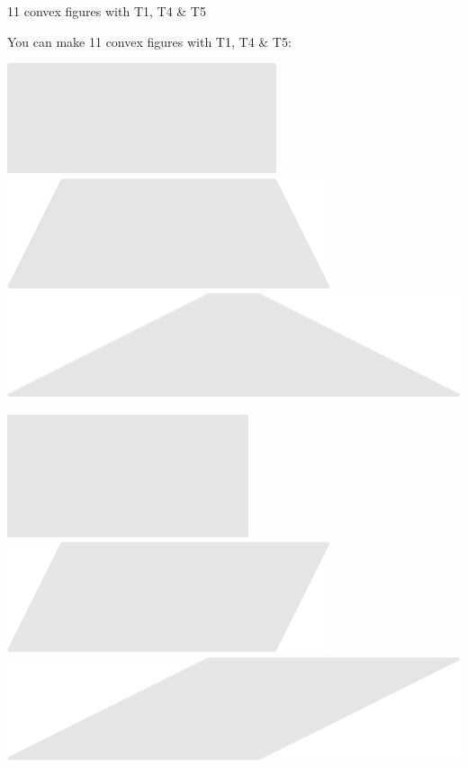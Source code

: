 \documentclass[14pt]{beamer}
\begin{document}
    \begin{frame}{11 convex figures with T1, T4 \& T5}
        \begin{center}
            You can make 11 convex figures with T1, T4 \& T5:

            \bigskip \bigskip

            \includegraphics[scale=0.39]{figures/figure004b.pdf}\qquad
            \includegraphics[scale=0.39]{figures/figure004e.pdf}\qquad
            \includegraphics[scale=0.39]{figures/figure004f.pdf}\\

            \bigskip\medskip

            \includegraphics[scale=0.39]{figures/figure004a.pdf}\phantom{.}\qquad
            \includegraphics[scale=0.39]{figures/figure004h.pdf}\qquad
            \includegraphics[scale=0.39]{figures/figure004i.pdf}\\


\end{center}
\end{frame}
\end{document}
